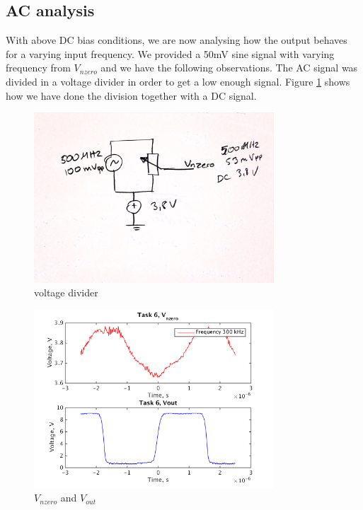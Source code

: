 \documentclass[a4paper,english,11pt]{article}
\begin{document}
\newpage
\subsection*{AC analysis}
With above DC bias conditions, we are now analysing how the output behaves for a varying input frequency. We provided a 50mV sine signal with varying frequency from  
$V_{nzero}$ and we have the following observations. The AC signal was divided in a voltage divider in order to get a low enough signal. Figure \ref{fig:voltage:div} shows how
we have done the division together with a DC signal.
\begin{figure}[H]
 \centering
  \includegraphics[width=0.8\textwidth]{img/ac_og_cd}
  \caption{ voltage divider}
  \label{fig:voltage:div}	
\end{figure}


\begin{figure}[H]
 \centering
  \includegraphics[width=0.8\textwidth]{img/task6_b_1.png}
  \caption{ $V_{nzero}$ and  $V_{out}$}
  \label{freq1}	
\end{figure}
\end{document}

